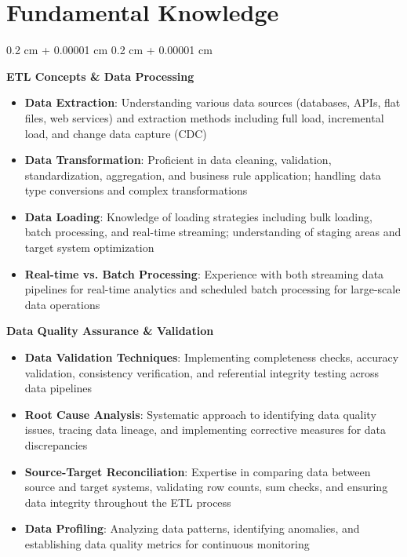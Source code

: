 \documentclass[10pt, letterpaper]{article}
\newenvironment{highlightsforbulletentries}{
    \begin{itemize}[
        topsep=0.10 cm,
        parsep=0.10 cm,
        partopsep=0pt,
        itemsep=0pt,
        leftmargin=10pt
    ]
    }{
    \end{itemize}
} %
\newenvironment{onecolentry}{
    \begin{adjustwidth}{
        0.2 cm + 0.00001 cm
    }{
        0.2 cm + 0.00001 cm
    }
    }{
    \end{adjustwidth}
} %
\begin{document}
    \section{Fundamental Knowledge}
    \begin{onecolentry}
        \textbf{ETL Concepts \& Data Processing}
        \begin{highlightsforbulletentries}
            \item \textbf{Data Extraction}: Understanding various data sources (databases, APIs, flat files, web services) and extraction methods including full load, incremental load, and change data capture (CDC)
            \item \textbf{Data Transformation}: Proficient in data cleaning, validation, standardization, aggregation, and business rule application; handling data type conversions and complex transformations
            \item \textbf{Data Loading}: Knowledge of loading strategies including bulk loading, batch processing, and real-time streaming; understanding of staging areas and target system optimization
            \item \textbf{Real-time vs. Batch Processing}: Experience with both streaming data pipelines for real-time analytics and scheduled batch processing for large-scale data operations
        \end{highlightsforbulletentries}

        \vspace{0.2 cm}
        \textbf{Data Quality Assurance \& Validation}
        \begin{highlightsforbulletentries}
            \item \textbf{Data Validation Techniques}: Implementing completeness checks, accuracy validation, consistency verification, and referential integrity testing across data pipelines
            \item \textbf{Root Cause Analysis}: Systematic approach to identifying data quality issues, tracing data lineage, and implementing corrective measures for data discrepancies
            \item \textbf{Source-Target Reconciliation}: Expertise in comparing data between source and target systems, validating row counts, sum checks, and ensuring data integrity throughout the ETL process
            \item \textbf{Data Profiling}: Analyzing data patterns, identifying anomalies, and establishing data quality metrics for continuous monitoring
        \end{highlightsforbulletentries}


\end{onecolentry}
\end{document}
